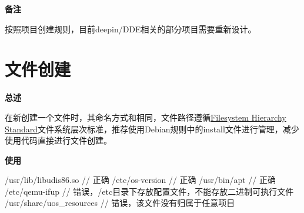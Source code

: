 

\textbf{备注}

按照项目创建规则，目前deepin/DDE相关的部分项目需要重新设计。

\section{文件创建}

\textbf{总述}

在新创建一个文件时，其命名方式和相同，文件路径遵循\href{https://refspecs.linuxfoundation.org/FHS_3.0/fhs-3.0.html}{Filesystem Hierarchy Standard}文件系统层次标准，推荐使用Debian规则中的install文件进行管理，减少使用代码直接进行文件创建。

\textbf{使用}

\begin{cppcode}
  /usr/lib/libudis86.so       // 正确
  /etc/os-version             // 正确
  /usr/bin/apt                // 正确
  /etc/qemu-ifup              // 错误，/etc目录下存放配置文件，不能存放二进制可执行文件
  /usr/share/uos_resources    // 错误，该文件没有归属于任意项目
\end{cppcode}